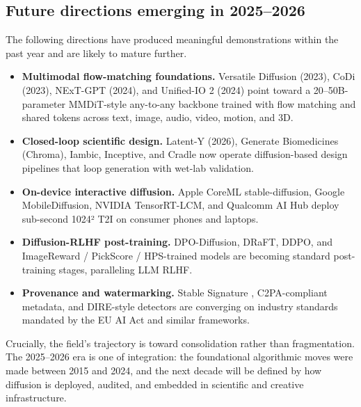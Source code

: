 \documentclass{article}
\begin{document}
\subsection{Future directions emerging in 2025--2026}\label{future-directions-emerging-in-20252026}

The following directions have produced meaningful demonstrations within the past year and are likely to mature further.

\begin{itemize}

\item
  \textbf{Multimodal flow-matching foundations.} Versatile Diffusion (2023), CoDi (2023), NExT-GPT (2024), and Unified-IO 2 (2024) point toward a 20--50B-parameter MMDiT-style any-to-any backbone trained with flow matching and shared tokens across text, image, audio, video, motion, and 3D.
\item
  \textbf{Closed-loop scientific design.} Latent-Y (2026), Generate Biomedicines (Chroma), Iambic, Inceptive, and Cradle now operate diffusion-based design pipelines that loop generation with wet-lab validation.
\item
  \textbf{On-device interactive diffusion.} Apple CoreML stable-diffusion, Google MobileDiffusion, NVIDIA TensorRT-LCM, and Qualcomm AI Hub deploy sub-second 1024² T2I on consumer phones and laptops.
\item
  \textbf{Diffusion-RLHF post-training.} DPO-Diffusion, DRaFT, DDPO, and ImageReward / PickScore / HPS-trained models are becoming standard post-training stages, paralleling LLM RLHF.
\item
  \textbf{Provenance and watermarking.} Stable Signature \citep{fernandez2023thestablesignature}, C2PA-compliant metadata, and DIRE-style detectors are converging on industry standards mandated by the EU AI Act and similar frameworks.
\end{itemize}

Crucially, the field's trajectory is toward consolidation rather than fragmentation. The 2025--2026 era is one of integration: the foundational algorithmic moves were made between 2015 and 2024, and the next decade will be defined by how diffusion is deployed, audited, and embedded in scientific and creative infrastructure.



\end{document}
